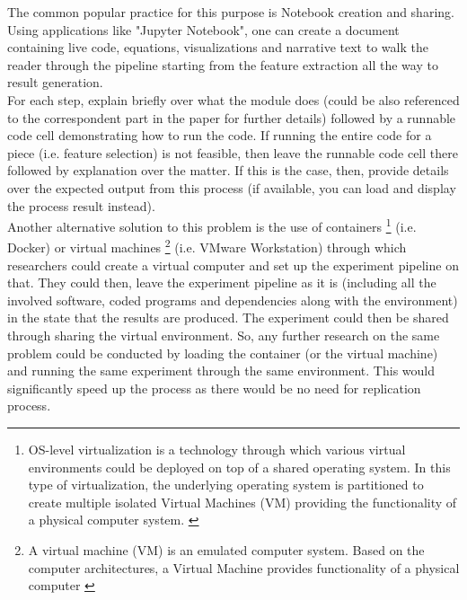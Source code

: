     The common popular practice for this purpose is Notebook creation and sharing. Using applications like "Jupyter Notebook", one can create a 
    document containing live code, equations, visualizations and narrative text to walk the reader through the pipeline starting from 
    the feature extraction all the way to result generation.\\
    
    For each step, explain briefly over what the module does (could be also referenced to the correspondent part in the paper for further details) 
    followed by a runnable code cell demonstrating how to run the code. 
    If running the entire code for a piece (i.e. feature selection) is not feasible, then leave the runnable code cell there followed by 
    explanation over the matter. If this is the case, then, provide details over the expected output from this process 
    (if available, you can load and display the process result instead).\\
    
    Another alternative solution to this problem is the use of containers \footnote{OS-level virtualization is a technology through which various virtual 
    environments could be deployed on top of a shared operating system. In this type of virtualization, the underlying operating system is partitioned
    to create multiple isolated Virtual Machines (VM) providing the functionality of a physical computer system. \cite{osLevelVM}} (i.e. Docker) 
    or virtual machines \footnote{A virtual machine (VM) is an emulated computer system. Based on the computer architectures, 
    a Virtual Machine provides functionality of a physical computer \cite{virtualizationOverview}} (i.e. VMware Workstation) 
    through which researchers could create  
    a virtual computer and set up the experiment pipeline on that. They could then, leave the experiment 
    pipeline as it is (including all the involved software, coded programs and dependencies along with the environment) 
    in the state that the results are produced. 
    The experiment could then be shared through sharing the virtual environment. So, any 
    further research on the same problem could be conducted by loading the container (or the virtual machine) and running 
    the same experiment through the same environment. This would significantly speed up the process as there would be no need for  
    replication process.
    

